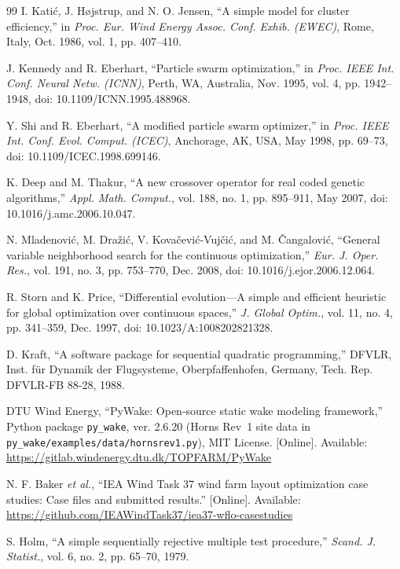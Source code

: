 \begin{thebibliography}{99}
I. Kati\'c, J. H\o jstrup, and N. O. Jensen, ``A simple model for cluster efficiency,'' in \textit{Proc. Eur. Wind Energy Assoc. Conf. Exhib. (EWEC)}, Rome, Italy, Oct. 1986, vol. 1, pp. 407--410.

J. Kennedy and R. Eberhart, ``Particle swarm optimization,'' in \textit{Proc. IEEE Int. Conf. Neural Netw. (ICNN)}, Perth, WA, Australia, Nov. 1995, vol. 4, pp. 1942--1948, doi: 10.1109/ICNN.1995.488968.

Y. Shi and R. Eberhart, ``A modified particle swarm optimizer,'' in \textit{Proc. IEEE Int. Conf. Evol. Comput. (ICEC)}, Anchorage, AK, USA, May 1998, pp. 69--73, doi: 10.1109/ICEC.1998.699146.

K. Deep and M. Thakur, ``A new crossover operator for real coded genetic algorithms,'' \textit{Appl. Math. Comput.}, vol. 188, no. 1, pp. 895--911, May 2007, doi: 10.1016/j.amc.2006.10.047.

N. Mladenovi\'c, M. Dra\v{z}i\'c, V. Kova\v{c}evi\'c-Vuj\v{c}i\'c, and M. \v{C}angalovi\'c, ``General variable neighborhood search for the continuous optimization,'' \textit{Eur. J. Oper. Res.}, vol. 191, no. 3, pp. 753--770, Dec. 2008, doi: 10.1016/j.ejor.2006.12.064.

R. Storn and K. Price, ``Differential evolution---A simple and efficient heuristic for global optimization over continuous spaces,'' \textit{J. Global Optim.}, vol. 11, no. 4, pp. 341--359, Dec. 1997, doi: 10.1023/A:1008202821328.

D. Kraft, ``A software package for sequential quadratic programming,'' DFVLR, Inst. f\"ur Dynamik der Flugsysteme, Oberpfaffenhofen, Germany, Tech. Rep. DFVLR-FB 88-28, 1988.

DTU Wind Energy, ``PyWake: Open-source static wake modeling framework,'' Python package \texttt{py\_wake}, ver. 2.6.20 (Horns Rev~1 site data in \texttt{py\_wake/examples/data/hornsrev1.py}), MIT License. [Online]. Available: \url{https://gitlab.windenergy.dtu.dk/TOPFARM/PyWake}

N. F. Baker \textit{et al.}, ``IEA Wind Task 37 wind farm layout optimization case studies: Case files and submitted results.'' [Online]. Available: \url{https://github.com/IEAWindTask37/iea37-wflo-casestudies}

S. Holm, ``A simple sequentially rejective multiple test procedure,'' \textit{Scand. J. Statist.}, vol. 6, no. 2, pp. 65--70, 1979.


\end{thebibliography}

